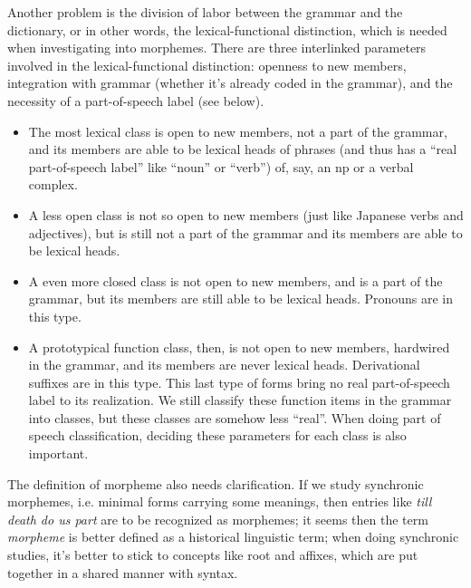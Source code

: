 \documentclass[UTF8, a4paper, oneside, scheme=plain, 12pt]{ctexrep}
\newcommand*{\term}[1]{\emph{#1}}
\newcommand{\form}[1]{\emph{#1}}
\begin{document}
{Another problem is the division of labor 
between the grammar and the dictionary, 
or in other words, the lexical-functional distinction,
which is needed when investigating into morphemes. 
There are three interlinked parameters involved in the lexical-functional distinction:
openness to new members, 
integration with grammar (whether it's already coded in the grammar),
and the necessity of a part-of-speech label (see below).
\begin{itemize}
    \item The most lexical class is open to new members, 
    not a part of the grammar,
    and its members are able to be lexical heads of phrases
    (and thus has a ``real part-of-speech label'' 
    like ``noun'' or ``verb'') 
    of, say, an \acs{np} or a verbal complex.
    \item A less open class is not so open to new members 
    (just like Japanese verbs and adjectives),
    but is still not a part of the grammar 
    and its members are able to be lexical heads. 
    \item A even more closed class is not open to new members,
    and is a part of the grammar,
    but its members are still able to be lexical heads.
    Pronouns are in this type.
    \item A prototypical function class, then, 
    is not open to new members, hardwired in the grammar, 
    and its members are never lexical heads.
    Derivational suffixes are in this type.
    This last type of forms 
    bring no real part-of-speech label to its realization.
    We still classify these function items in the grammar into classes,
    but these classes are somehow less ``real''.
    When doing part of speech classification,
    deciding these parameters for each class 
    is also important.
\end{itemize}

The definition of morpheme also needs clarification.
If we study synchronic morphemes, 
i.e. minimal forms carrying some meanings, 
then entries like \form{till death do us part} 
are to be recognized as morphemes; 
it seems then the term \term{morpheme} is better defined 
as a historical linguistic term; 
when doing synchronic studies, 
it's better to stick to concepts like root and affixes, 
which are put together in a shared manner with syntax.



}
\end{document}
